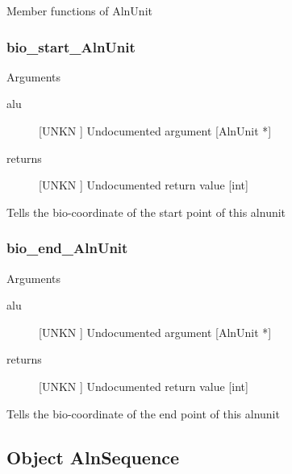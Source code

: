 Member functions of AlnUnit

\subsubsection{bio_start_AlnUnit}

Arguments
\begin{description}
\item[alu] [UNKN ] Undocumented argument [AlnUnit *]
\item[returns] [UNKN ] Undocumented return value [int]
\end{description}
Tells the bio-coordinate of the
start point of this alnunit


\subsubsection{bio_end_AlnUnit}

Arguments
\begin{description}
\item[alu] [UNKN ] Undocumented argument [AlnUnit *]
\item[returns] [UNKN ] Undocumented return value [int]
\end{description}
Tells the bio-coordinate of the
end point of this alnunit


\subsection{Object AlnSequence}

\label{object_AlnSequence}

